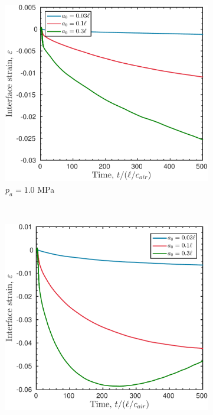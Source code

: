 \begin{figure}
  \centering
  \begin{subfigure}[b]{0.49\textwidth}
    \includegraphics[width=\textwidth]{./figs/lung_figs/rmawave_1_A10_a03,10,30_strain_08-Mar-2017}
    \caption{\label{fig:strain_multi-a0-A10} $p_a = 1.0$ MPa}
  \end{subfigure}
  ~ 
  \begin{subfigure}[b]{0.49\textwidth}
    \includegraphics[width=\textwidth]{./figs/lung_figs/rmawave_1_A25_a03,10,30_strain_08-Mar-2017}

\end{subfigure}
\end{figure}
